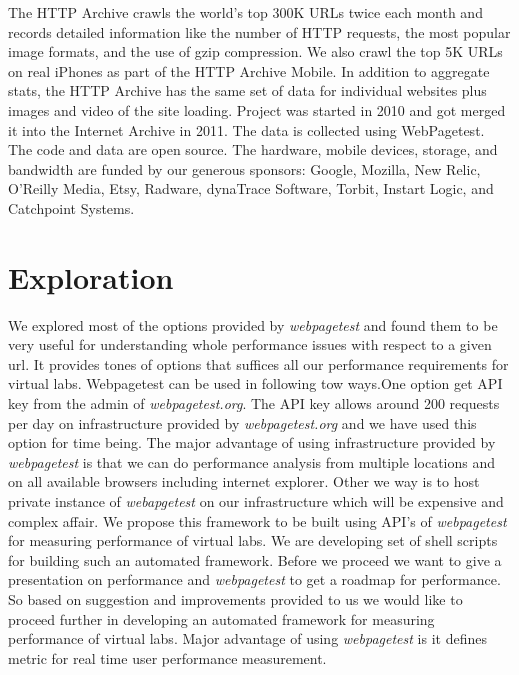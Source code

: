 \documentclass[a4paper,10pt]{article}
\begin{document}
The HTTP Archive crawls the world’s top 300K URLs twice each month and records detailed information like the number of HTTP requests,
the most popular image formats, and the use of gzip compression. We also crawl the top 5K URLs on real iPhones as part of the HTTP
Archive Mobile. In addition to aggregate stats, the HTTP Archive has the same set of data for individual websites plus images and 
video of the site loading. Project was started in  2010 and got merged it into the Internet Archive in 2011. The data is collected
using WebPagetest. The code and data are open source. The hardware, mobile devices, storage, and bandwidth are funded by our generous
sponsors:  Google, Mozilla, New Relic, O’Reilly Media, Etsy, Radware, dynaTrace Software, Torbit, Instart Logic, and Catchpoint Systems.
\section{Exploration}
We explored most of the options provided by {\it webpagetest} and found them to be very useful for understanding whole
performance issues with respect to a given url. It provides tones of options that suffices all our performance requirements
for virtual labs. Webpagetest can be used in following tow ways.One option get API key from the admin of {\it webpagetest.org}.
The API key allows around 200 requests per day 
on infrastructure provided by {\it webpagetest.org} and we have used this option for time being.
The major advantage of using infrastructure provided by {\it webpagetest} is that we can do performance analysis from multiple locations
and on all available browsers including internet explorer. 
Other we way is to host private instance of {\it webapgetest} on our infrastructure which will be expensive and complex affair.
We propose this framework to be built using API's of {\it webpagetest}
for measuring performance of virtual labs. We are developing set of shell scripts for building such an automated framework.
Before we proceed we want to
give a presentation on performance and {\it webpagetest} to get a roadmap for performance. So based on suggestion and improvements
provided to us we would like to proceed further in developing an automated framework for measuring performance of virtual labs.
Major advantage of using {\it webpagetest} is it defines metric for real time user performance measurement. 
\end{document}
